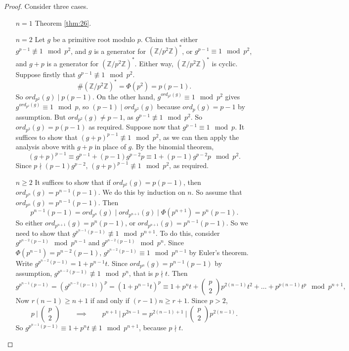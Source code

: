 \documentclass{article}
\newcommand{\Z}{\mathbb{Z}}
\newcommand{\rb}[1]{\left( #1 \right)}
\newcommand{\two}[2]{\begin{pmatrix} #1 \\ #2 \end{pmatrix}}
\theoremstyle{definition}\newtheorem{definition}{Definition}
\theoremstyle{definition}\newtheorem*{remark}{Remark}
\theoremstyle{definition}\newtheorem*{example}{Example}
\theoremstyle{definition}\newtheorem*{note}{Note}
\begin{document}
\begin{proof}
Consider three cases.
\begin{itemize}
\item[$ n = 1 $] Theorem \ref{thm:26}.
\item[$ n = 2 $] Let $ g $ be a primitive root modulo $ p $. Claim that either $ g^{p - 1} \not\equiv 1 \mod p^2 $, and $ g $ is a generator for $ \rb{\Z / p^2\Z}^* $, or $ g^{p - 1} \equiv 1 \mod p^2 $, and $ g + p $ is a generator for $ \rb{\Z / p^2\Z}^* $. Either way, $ \rb{\Z / p^2\Z}^* $ is cyclic. Suppose firstly that $ g^{p - 1} \not\equiv 1 \mod p^2 $.
$$ \#\rb{\Z / p^2\Z}^* = \Phi\rb{p^2} = p\rb{p - 1}. $$
So $ ord_{p^2}\rb{g} \mid p\rb{p - 1} $. On the other hand, $ g^{ord_{p^2}\rb{g}} \equiv 1 \mod p^2 $ gives $ g^{ord_{p^2}\rb{g}} \equiv 1 \mod p $, so $ \rb{p - 1} \mid ord_{p^2}\rb{g} $ because $ ord_p\rb{g} = p - 1 $ by assumption. But $ ord_{p^2}\rb{g} \ne p - 1 $, as $ g^{p - 1} \not\equiv 1 \mod p^2 $. So $ ord_{p^2}\rb{g} = p\rb{p - 1} $ as required. Suppose now that $ g^{p - 1} \equiv 1 \mod p $. It suffices to show that $ \rb{g + p}^{p - 1} \not\equiv 1 \mod p^2 $, as we can then apply the analysis above with $ g + p $ in place of $ g $. By the binomial theorem,
$$ \rb{g + p}^{p - 1} \equiv g^{p - 1} + \rb{p - 1}g^{p - 2}p \equiv 1 + \rb{p - 1}g^{p - 2}p \mod p^2. $$
Since $ p \nmid \rb{p - 1}g^{p - 2} $, $ \rb{g + p}^{p - 1} \not\equiv 1 \mod p^2 $, as required.
\item[$ n \ge 2 $] It suffices to show that if $ ord_{p^2}\rb{g} = p\rb{p - 1} $, then $ ord_{p^n}\rb{g} = p^{n - 1}\rb{p - 1} $. We do this by induction on $ n $. So assume that $ ord_{p^n}\rb{g} = p^{n - 1}\rb{p - 1} $. Then
$$ p^{n - 1}\rb{p - 1} = ord_{p^n}\rb{g} \mid ord_{p^{n + 1}}\rb{g} \mid \Phi\rb{p^{n + 1}} = p^n\rb{p - 1}. $$
So either $ ord_{p^{n + 1}}\rb{g} = p^n\rb{p - 1} $, or $ ord_{p^{n + 1}}\rb{g} = p^{n - 1}\rb{p - 1} $. So we need to show that $ g^{p^{n - 1}\rb{p - 1}} \not\equiv 1 \mod p^{n + 1} $. To do this, consider $ g^{p^{n - 2}\rb{p - 1}} \mod p^{n - 1} $ and $ g^{p^{n - 2}\rb{p - 1}} \mod p^n $. Since $ \Phi\rb{p^{n - 1}} = p^{n - 2}\rb{p - 1} $, $ g^{p^{n - 2}\rb{p - 1}} \equiv 1 \mod p^{n - 1} $ by Euler's theorem. Write $ g^{p^{n - 2}\rb{p - 1}} = 1 + p^{n - 1}t $. Since $ ord_{p^n}\rb{g} = p^{n - 1}\rb{p - 1} $ by assumption, $ g^{p^{n - 2}\rb{p - 1}} \not\equiv 1 \mod p^n $, that is $ p \nmid t $. Then
$$ g^{p^{n - 1}\rb{p - 1}} = \rb{g^{p^{n - 2}\rb{p - 1}}}^p = \rb{1 + p^{n - 1}t}^p \equiv 1 + p^nt + \two{p}{2}p^{2\rb{n - 1}}t^2 + \dots + p^{p\rb{n - 1}}t^p \mod p^{n + 1}, $$
Now $ r\rb{n - 1} \ge n + 1 $ if and only if $ \rb{r - 1}n \ge r + 1 $. Since $ p > 2 $,
$$ p \ \Big| \ \two{p}{2} \qquad \implies \qquad p^{n + 1} \ \Big| \ p^{2n - 1} = p^{2\rb{n - 1} + 1} \ \Big| \ \two{p}{2}p^{2\rb{n - 1}}. $$
So $ g^{p^{n - 1}\rb{p - 1}} \equiv 1 + p^nt \not\equiv 1 \mod p^{n + 1} $, because $ p \nmid t $.
\end{itemize}
\end{proof}
\end{document}
